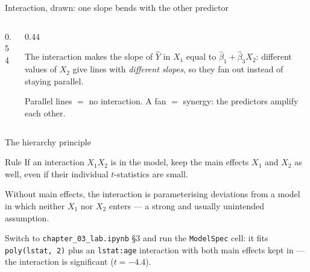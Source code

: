 \documentclass[aspectratio=169,11pt]{beamer}
\begin{document}
\begin{frame}{Interaction, drawn: one slope bends with the other predictor}
  \begin{columns}[T]
    \begin{column}{0.54\textwidth}
      \begin{center}
      \end{center}
    \end{column}
    \begin{column}{0.44\textwidth}
      \begin{readme}
        The interaction makes the slope of $\hat Y$ in $X_1$ equal to
        $\hat\beta_1+\hat\beta_3 X_2$: different values of $X_2$ give lines
        with \emph{different slopes}, so they fan out instead of staying
        parallel.
      \end{readme}
      \begin{takeaway}
        Parallel lines $=$ no interaction. A fan $=$ synergy: the
        predictors amplify each other.
      \end{takeaway}
    \end{column}
  \end{columns}
\end{frame}

\begin{frame}{The hierarchy principle}
  \begin{alertblock}{Rule}
    If an interaction $X_1 X_2$ is in the model, keep the main effects
    $X_1$ and $X_2$ as well, even if their individual $t$-statistics
    are small.
  \end{alertblock}
  \begin{readme}[Why]
    Without main effects, the interaction is parameterising deviations
    from a model in which neither $X_1$ nor $X_2$ enters --- a strong
    and usually unintended assumption.
  \end{readme}
  \begin{labnote}
    Switch to \texttt{chapter\_03\_lab.ipynb} \S3 and run the
    \texttt{ModelSpec} cell: it fits \texttt{poly(lstat,\,2)} plus an
    \texttt{lstat:age} interaction with both main effects kept in --- the
    interaction is significant ($t=-4.4$).
  \end{labnote}
\end{frame}
\end{document}
